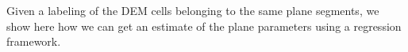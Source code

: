 Given a labeling of the DEM cells belonging to the same plane segments, we show
here how we can get an estimate of the plane parameters using a regression
framework.


